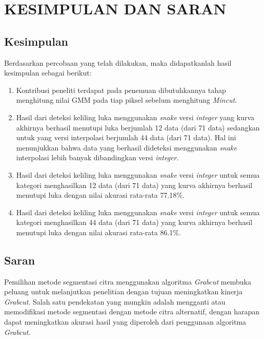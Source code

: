 
\chapter{KESIMPULAN DAN SARAN}

\section{Kesimpulan}
Berdasarkan percobaan yang telah dilakukan, maka didapatkanlah hasil kesimpulan sebagai berikut:
\begin{enumerate}
	\item Kontribusi peneliti terdapat pada penemuan dibutuhkannya tahap menghitung nilai GMM pada tiap piksel sebelum menghitung \emph{Mincut}.
	\item Hasil dari deteksi keliling luka menggunakan \emph{snake} versi \emph{integer} yang kurva akhirnya berhasil menutupi luka berjumlah 12 data (dari 71 data) sedangkan untuk yang versi interpolasi berjumlah 44 data (dari 71 data). Hal ini menunjukkan bahwa data yang berhasil dideteksi menggunakan \emph{snake} interpolasi lebih banyak dibandingkan versi \emph{integer}.
	\item Hasil dari deteksi keliling luka menggunakan \emph{snake} versi \emph{integer} untuk semua kategori menghasilkan 12 data (dari 71 data) yang kurva akhirnya berhasil menutupi luka dengan nilai akurasi rata-rata 77.18\%.
	\item Hasil dari deteksi keliling luka menggunakan \emph{snake} versi \emph{integer} untuk semua kategori menghasilkan 44 data (dari 71 data) yang kurva akhirnya berhasil menutupi luka dengan nilai akurasi rata-rata 86.1\%.
\end{enumerate}

\section{Saran}
Pemilihan metode segmentasi citra menggunakan algoritma \emph{Grabcut} membuka peluang 
untuk melanjutkan penelitian dengan tujuan meningkatkan kinerja \emph{Grabcut}. 
Salah satu pendekatan yang mungkin adalah mengganti atau memodifikasi metode 
segmentasi dengan metode citra alternatif, dengan harapan dapat meningkatkan 
akurasi hasil yang diperoleh dari penggunaan algoritma \emph{Grabcut}.

\begin{comment}

\end{comment}